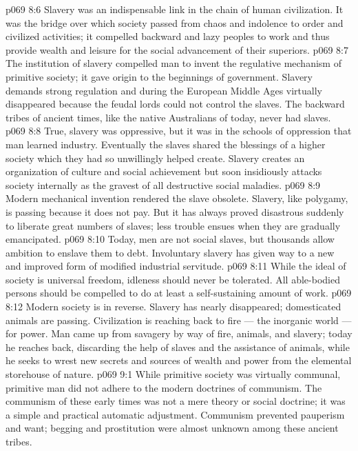 \vs p069 8:6 \pc Slavery was an indispensable link in the chain of human civilization. It was the bridge over which society passed from chaos and indolence to order and civilized activities; it compelled backward and lazy peoples to work and thus provide wealth and leisure for the social advancement of their superiors.
\vs p069 8:7 The institution of slavery compelled man to invent the regulative mechanism of primitive society; it gave origin to the beginnings of government. Slavery demands strong regulation and during the European Middle Ages virtually disappeared because the feudal lords could not control the slaves. The backward tribes of ancient times, like the native Australians of today, never had slaves.
\vs p069 8:8 True, slavery was oppressive, but it was in the schools of oppression that man learned industry. Eventually the slaves shared the blessings of a higher society which they had so unwillingly helped create. Slavery creates an organization of culture and social achievement but soon insidiously attacks society internally as the gravest of all destructive social maladies.
\vs p069 8:9 \pc Modern mechanical invention rendered the slave obsolete. Slavery, like polygamy, is passing because it does not pay. But it has always proved disastrous suddenly to liberate great numbers of slaves; less trouble ensues when they are gradually emancipated.
\vs p069 8:10 \pc Today, men are not social slaves, but thousands allow ambition to enslave them to debt. Involuntary slavery has given way to a new and improved form of modified industrial servitude.
\vs p069 8:11 While the ideal of society is universal freedom, idleness should never be tolerated. All able\hyp{}bodied persons should be compelled to do at least a self\hyp{}sustaining amount of work.
\vs p069 8:12 Modern society is in reverse. Slavery has nearly disappeared; domesticated animals are passing. Civilization is reaching back to fire --- the inorganic world --- for power. Man came up from savagery by way of fire, animals, and slavery; today he reaches back, discarding the help of slaves and the assistance of animals, while he seeks to wrest new secrets and sources of wealth and power from the elemental storehouse of nature.
\vs p069 9:1 While primitive society was virtually communal, primitive man did not adhere to the modern doctrines of communism. The communism of these early times was not a mere theory or social doctrine; it was a simple and practical automatic adjustment. Communism prevented pauperism and want; begging and prostitution were almost unknown among these ancient tribes.
